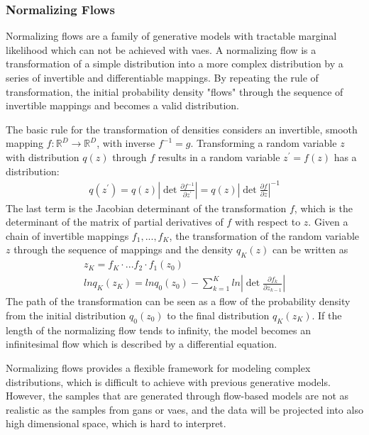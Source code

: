 \documentclass[12pt,DIV14,BCOR12mm,a4paper,footinclude=false,headinclude,parskip=half-,twoside,openright,cleardoublepage=empty,toc=index,bibliography=totoc,listof=totoc]{scrreprt}
\numberwithin{equation}{chapter}
\begin{document}
\subsubsection{Normalizing Flows}
Normalizing flows \cite{rezende2016variational} are a family of generative models with tractable marginal likelihood which can not be achieved with \glspl{vae}. A normalizing flow is a transformation of a simple distribution into a more complex distribution by a series of invertible and differentiable mappings. By repeating the rule of transformation, the initial probability density "flows" through the sequence of invertible mappings and becomes a valid distribution.

The basic rule for the transformation of densities considers an invertible, smooth mapping $f: \mathbb{R}^{D} \rightarrow \mathbb{R}^{D}$, with inverse $f^{-1} = g$. Transforming a random variable $z$ with distribution $q(z)$ through $f$ results in a random variable $z^{'}  = f(z)$ has a distribution:
\begin{align}
  q(z^{'}) = q(z) \left| \det \frac{\partial f^{-1}}{\partial z^{'}} \right| = q(z) \left| \det \frac{\partial f}{\partial z} \right|^{-1}
\end{align}
The last term is the Jacobian determinant of the transformation $f$, which is the determinant of the matrix of partial derivatives of $f$ with respect to $z$. Given a chain of invertible mappings $f_{1},...,f_{K}$, the transformation of the random variable $z$ through the sequence of mappings and the density $q_{K}(z)$ can be written as
\begin{gather}
  z_{K} = f_{K} \cdot ... f_{2} \cdot f_{1}(z_{0})\\
  lnq_{K}(z_{K}) = lnq_{0}(z_{0}) - \sum_{k=1}^{K} ln \left| \det \frac{\partial f_{k}}{\partial z_{k-1}} \right|
\end{gather}
The path of the transformation can be seen as a flow of the probability density from the initial distribution $q_{0}(z_{0})$ to the final distribution $q_{K}(z_{K})$. If the length of the normalizing flow tends to infinity, the model becomes an infinitesimal flow which is described by a differential equation.

Normalizing flows provides a flexible framework for modeling complex distributions, which is difficult to achieve with previous generative models. However, the samples that are generated through flow-based models are not as realistic as the samples from \glspl{gan} or \glspl{vae}, and the data will be projected into also high dimensional space, which is hard to interpret.
\end{document}
